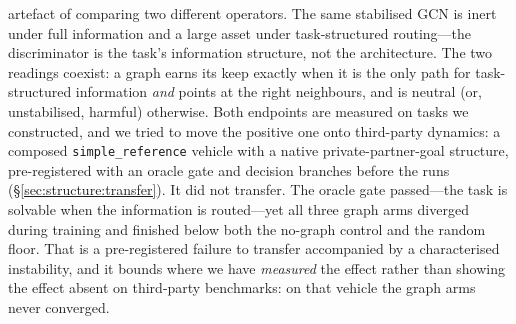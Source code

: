 \documentclass[10pt]{article}
\begin{document}
artefact of comparing two different operators. The same stabilised GCN is
inert under full information and a large asset under task-structured
routing---the discriminator is the task's information structure, not the
architecture. The two readings coexist: a graph earns its keep
exactly when it is the only path for task-structured information \emph{and}
points at the right neighbours, and is neutral (or, unstabilised, harmful)
otherwise. Both endpoints are measured on tasks we constructed, and we tried to
move the positive one onto third-party dynamics: a composed
\texttt{simple\_reference} vehicle with a native private-partner-goal
structure, pre-registered with an oracle gate and decision branches before the
runs (\S\ref{sec:structure:transfer}). It did not transfer. The oracle gate
passed---the task is solvable when the information is routed---yet all three
graph arms diverged during training and finished below both the no-graph
control and the random floor. That is a pre-registered failure to transfer
accompanied by a characterised instability, and it bounds where we have
\emph{measured} the effect rather than showing the effect absent on third-party
benchmarks: on that vehicle the graph arms never converged.
\end{document}
